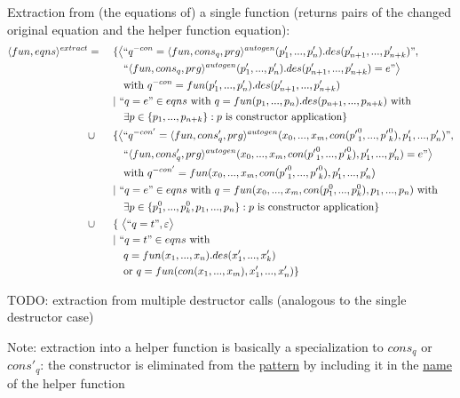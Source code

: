 \documentclass[11pt]{article} %
\begin{document}
Extraction from (the equations of) a single function (returns pairs of the changed original equation and the helper function equation):
\begin{alignat*}{2}
\langle fun, eqns \rangle^{extract} & = ~&& \{ \big\langle `` q^{-con} = \langle fun, cons_q, prg \rangle^{autogen}(p'_1, ..., p'_n).des(p'_{n+1}, ..., p'_{n+k}) ", \\
& &&\quad `` \langle fun, cons_q, prg \rangle^{autogen}(p'_1, ..., p'_n).des(p'_{n+1}, ..., p'_{n+k}) = e " \big\rangle \\
& &&\quad \textrm{with } q^{-con} = fun(p'_1, ..., p'_{n}).des(p'_{n+1}, ..., p'_{n+k}) \\
& && | ~ `` q = e " \in eqns \textrm{ with } q = fun(p_1, ..., p_n).des(p_{n+1}, ..., p_{n+k}) \textrm{ with} \\
& &&\quad \exists p \in \{p_1, ..., p_{n+k}\}: p \textrm{ is constructor application} \} \\
& \cup && \{ \big\langle `` q^{-con'} = \langle fun, cons'_q, prg \rangle^{autogen}(x_0, ..., x_m, con({p'}_1^0, ..., {p'}_k^0), p'_1, ..., p'_n) ", \\
& &&\quad `` \langle fun, cons'_q, prg \rangle^{autogen}(x_0, ..., x_m, con({p'}_1^0, ..., {p'}_k^0), p'_1, ..., p'_n) = e " \big\rangle \\
& &&\quad \textrm{with } q^{-con'} = fun(x_0, ..., x_m, con({p'}_1^0, ..., {p'}_k^0), p'_1, ..., p'_n) \\
& && | ~ `` q = e " \in eqns \textrm{ with } q = fun(x_0, ..., x_m, con(p^0_1, ..., p^0_k), p_1, ..., p_n) \textrm{ with} \\
& &&\quad \exists p \in \{p^0_1, ..., p^0_k, p_1, ..., p_n\}: p \textrm{ is constructor application} \} \\
& \cup && \{ ~ \big\langle `` q = t ", \varepsilon \big\rangle \\
& && | ~ `` q = t " \in eqns \textrm{ with } \\
& &&\quad q = fun(x_1, ..., x_n).des(x'_1, ..., x'_k)\\
& &&\quad \textrm{or } q = fun(con(x_1, ..., x_m), x'_1, ..., x'_n) \} \\
\end{alignat*}

TODO: extraction from multiple destructor calls (analogous to the single destructor case)

Note: extraction into a helper function is basically a specialization to $cons_q$ or $cons'_q$: the constructor is eliminated from the \underline{pattern} by including it in the \underline{name} of the helper function
\end{document}
